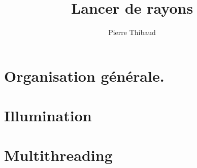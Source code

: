 \documentclass[10pt,a4paper]{beamer}
\author{Pierre \bsc{Donat-Bouillud} Thibaud \bsc{Ehret}}
\title{Lancer de rayons}
\begin{document}
\frame{\titlepage}

\frame{\tableofcontents}

\begin{frame}

\end{frame}


\section{Organisation générale.}


\section{Illumination}


\section{Multithreading} %


%
\end{document}
